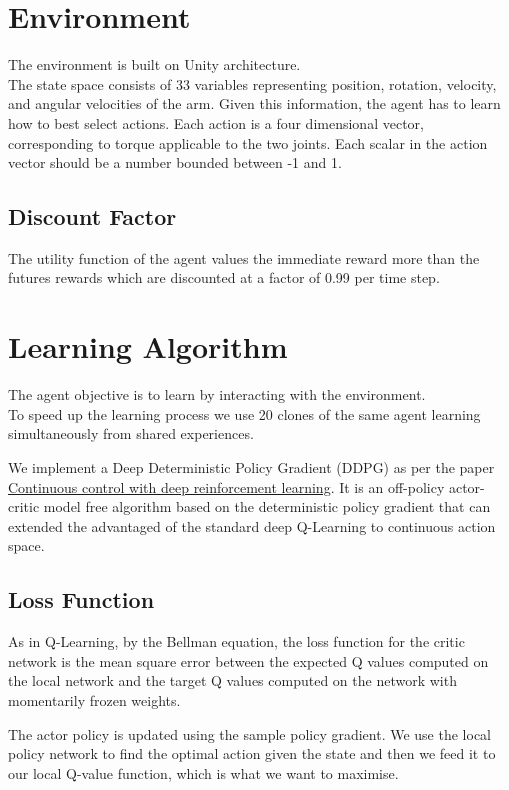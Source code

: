 \documentclass[pagenumber=off]{article}
\begin{document}
\section{Environment}
The environment is built on Unity architecture.\\
The state space consists of 33 variables representing position, rotation, velocity, and angular velocities of the arm. 
Given this information, the agent has to learn how to best select actions. Each action is a four dimensional vector, corresponding to torque applicable to the two joints. Each scalar in the action vector should be a number bounded between -1 and 1.

\subsection{Discount Factor}
The utility function of the agent values the immediate reward more than the futures rewards which are discounted at a factor of 0.99 per time step.


\section{Learning Algorithm} 
The agent objective is to learn by interacting with the environment.\\
To speed up the learning process we use 20 clones of the same agent learning simultaneously from shared experiences.

We implement a Deep Deterministic Policy Gradient (DDPG) as per the paper \href{https://arxiv.org/abs/1509.02971}{Continuous control with deep reinforcement learning}. It is an off-policy actor-critic model free algorithm based on the deterministic policy gradient that can extended the advantaged of the standard deep Q-Learning to continuous action space.


\subsection{Loss Function}

As in Q-Learning, by the Bellman equation, the loss function for the critic network is the mean square error between the expected Q values computed on the local network and the target Q values computed on the network with momentarily frozen weights.  

The actor policy is updated using the sample policy gradient. We use the local policy network to find the optimal action given the state and then we feed it to our local Q-value function, which is what we want to maximise. 
\end{document}
